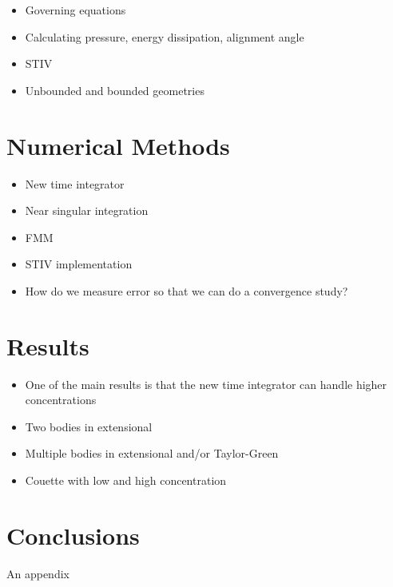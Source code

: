 \documentclass[preprint, 10pt]{elsarticle}
\begin{document}
\begin{itemize}
  \item Governing equations
  \item Calculating pressure, energy dissipation, alignment angle
  \item STIV
  \item Unbounded and bounded geometries
\end{itemize}


\section{Numerical Methods\label{s:method}} 

\begin{itemize}
  \item New time integrator
  \item Near singular integration
  \item FMM
  \item STIV implementation
  \item How do we measure error so that we can do a convergence study?
\end{itemize}

\section{Results\label{s:results}} 

\begin{itemize}
  \item One of the main results is that the new time integrator can
    handle higher concentrations
  \item Two bodies in extensional
  \item Multiple bodies in extensional and/or Taylor-Green
  \item Couette with low and high concentration
\end{itemize}

\section{Conclusions\label{s:conclusions}}


\begin{appendices}
An appendix
\end{appendices}


 

\end{document}
